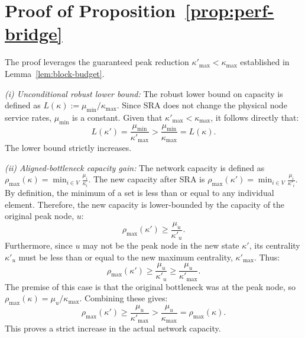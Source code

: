 \documentclass[journal]{IEEEtran}
\begin{document}
\section{Proof of Proposition~\ref{prop:perf-bridge}}
\label{app:proof_prop_perf_bridge}
\begin{IEEEproof}
The proof leverages the guaranteed peak reduction $\kappa'_{\max} < \kappa_{\max}$ established in Lemma~\ref{lem:block-budget}.

\noindent\textit{(i) Unconditional robust lower bound:}
The robust lower bound on capacity is defined as $L(\kappa) := \mu_{\min}/\kappa_{\max}$.
Since SRA does not change the physical node service rates, $\mu_{\min}$ is a constant.
Given that $\kappa'_{\max} < \kappa_{\max}$, it follows directly that:
\begin{equation}
L(\kappa') = \frac{\mu_{\min}}{\kappa'_{\max}} > \frac{\mu_{\min}}{\kappa_{\max}} = L(\kappa).
\end{equation}
The lower bound strictly increases.

\noindent\textit{(ii) Aligned-bottleneck capacity gain:}
The network capacity is defined as $\rho_{\max}(\kappa) = \min_{i \in V} \frac{\mu_i}{\kappa_i}$.
The new capacity after SRA is $\rho_{\max}(\kappa') = \min_{i \in V} \frac{\mu_i}{\kappa'_i}$.
By definition, the minimum of a set is less than or equal to any individual element. Therefore, the new capacity is lower-bounded by the capacity of the original peak node, $u$:
\begin{equation}
\rho_{\max}(\kappa') \ge \frac{\mu_u}{\kappa'_u}.
\end{equation}
Furthermore, since $u$ may not be the peak node in the new state $\kappa'$, its centrality $\kappa'_u$ must be less than or equal to the new maximum centrality, $\kappa'_{\max}$. Thus:
\begin{equation}
\rho_{\max}(\kappa') \ge \frac{\mu_u}{\kappa'_u} \ge \frac{\mu_u}{\kappa'_{\max}}.
\end{equation}
The premise of this case is that the original bottleneck was at the peak node, so $\rho_{\max}(\kappa) = \mu_u/\kappa_{\max}$. Combining these gives:
\begin{equation}
\rho_{\max}(\kappa') \ge \frac{\mu_u}{\kappa'_{\max}} > \frac{\mu_u}{\kappa_{\max}} = \rho_{\max}(\kappa).
\end{equation}
This proves a strict increase in the actual network capacity.
\end{IEEEproof}






\end{document}
